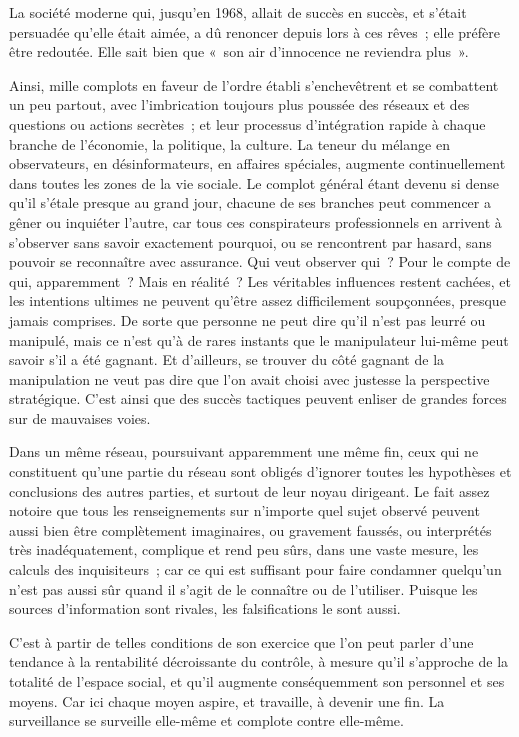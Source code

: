 \documentclass[french,twoside]{book} %
\begin{document}
La société moderne qui, jusqu’en 1968, allait de succès en succès, et s’était persuadée qu’elle était aimée, a dû renoncer depuis lors à ces rêves ; elle préfère être redoutée. Elle sait bien que « son air d’innocence ne reviendra plus ».\par
Ainsi, mille complots en faveur de l’ordre établi s’enchevêtrent et se combattent un peu partout, avec l’imbrication toujours plus poussée des réseaux et des questions ou actions secrètes ; et leur processus d’intégration rapide à chaque branche de l’économie, la politique, la culture. La teneur du mélange en observateurs, en désinformateurs, en affaires spéciales, augmente continuellement dans toutes les zones de la vie sociale. Le complot général étant devenu si dense qu’il s’étale presque au grand jour, chacune de ses branches peut commencer a gêner ou inquiéter l’autre, car tous ces conspirateurs professionnels en arrivent à s’observer sans savoir exactement pourquoi, ou se rencontrent par hasard, sans pouvoir se reconnaître avec assurance. Qui veut observer qui ? Pour le compte de qui, apparemment ? Mais en réalité ? Les véritables influences restent cachées, et les intentions ultimes ne peuvent qu’être assez difficilement soupçonnées, presque jamais comprises. De sorte que personne ne peut dire qu’il n’est pas leurré ou manipulé, mais ce n’est qu’à de rares instants que le manipulateur lui-même peut savoir s’il a été gagnant. Et d’ailleurs, se trouver du côté gagnant de la manipulation ne veut pas dire que l’on avait choisi avec justesse la perspective stratégique. C’est ainsi que des succès tactiques peuvent enliser de grandes forces sur de mauvaises voies.\par
Dans un même réseau, poursuivant apparemment une même fin, ceux qui ne constituent qu’une partie du réseau sont obligés d’ignorer toutes les hypothèses et conclusions des autres parties, et surtout de leur noyau dirigeant. Le fait assez notoire que tous les renseignements sur n’importe quel sujet observé peuvent aussi bien être complètement imaginaires, ou gravement faussés, ou interprétés très inadéquatement, complique et rend peu sûrs, dans une vaste mesure, les calculs des inquisiteurs ; car ce qui est suffisant pour faire condamner quelqu’un n’est pas aussi sûr quand il s’agit de le connaître ou de l’utiliser. Puisque les sources d’information sont rivales, les falsifications le sont aussi.\par
C’est à partir de telles conditions de son exercice que l’on peut parler d’une tendance à la rentabilité décroissante du contrôle, à mesure qu’il s’approche de la totalité de l’espace social, et qu’il augmente conséquemment son personnel et ses moyens. Car ici chaque moyen aspire, et travaille, à devenir une fin. La surveillance se surveille elle-même et complote contre elle-même.\par
\end{document}
